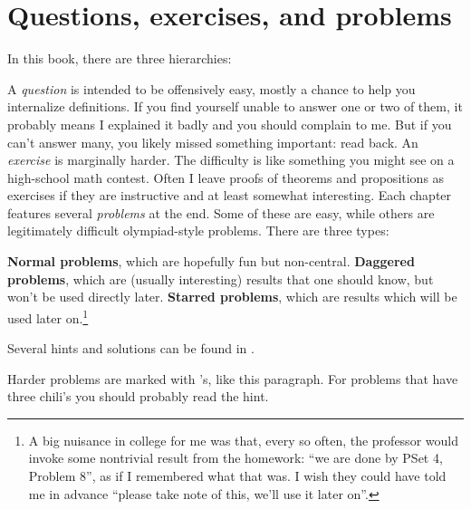 \eject

\section{Questions, exercises, and problems}
In this book, there are three hierarchies:
\begin{itemize}
	\ii A \emph{question} is intended to be offensively easy,
	mostly a chance to help you internalize definitions.
	If you find yourself unable to answer one or two of them,
	it probably means I explained it badly and you should complain to me.
	But if you can't answer many,
	you likely missed something important: read back.
	\ii An \emph{exercise} is marginally harder.
	The difficulty is like something you might see on a high-school math contest.
	Often I leave proofs of theorems and propositions as exercises
	if they are instructive and at least somewhat interesting.
	\ii Each chapter features several \emph{problems} at the end.
	Some of these are easy, while others are
	legitimately difficult olympiad-style problems.
	There are three types:
	\begin{itemize}
		\ii \textbf{Normal problems},
		which are hopefully fun but non-central.
		\ii \textbf{Daggered problems},
		which are (usually interesting) results that one should know,
		but won't be used directly later.
		\ii \textbf{Starred problems},
		which are results which will be used later on.\footnote{%
			A big nuisance in college for me was that,
			every so often, the professor
			would invoke some nontrivial result from the homework:
			``we are done by PSet 4, Problem 8'',
			as if I remembered what that was.
			I wish they could have told me in advance
			``please take note of this, we'll use it later on''.
		}
	\end{itemize}
\end{itemize}
Several hints and solutions can be found in .

\gim
Harder problems are marked with \chili's, like this paragraph.
For problems that have three chili's you should probably read the hint.

